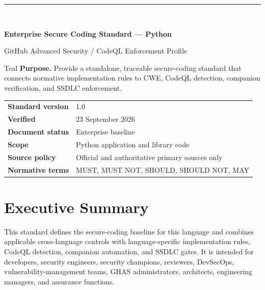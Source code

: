 \documentclass[10pt,letterpaper]{article}
\begin{document}
\fancyhead[L]{\textcolor{Muted}{Enterprise Secure Coding Standard --- Python}}
\fancyhead[R]{\textcolor{Muted}{v1.0 --- 23 September 2026}}
\hypersetup{pageanchor=false}
\begin{titlepage}
\thispagestyle{empty}
\vspace*{0.85in}
{\color{Teal}\rule{1.2in}{3pt}}\\[0.32in]
{\Huge\bfseries\color{Navy}Enterprise Secure Coding Standard --- Python\par}
\vspace{0.18in}
{\Large\color{Teal}GitHub Advanced Security / CodeQL Enforcement Profile\par}
\vspace{0.55in}
\begin{callout}{Teal}
\textbf{Purpose.} Provide a standalone, traceable secure-coding standard that connects normative implementation rules to CWE, CodeQL detection, companion verification, and SSDLC enforcement.
\end{callout}
\vfill
\begin{tabular}{@{}ll@{}}
\textbf{Standard version} & 1.0 \\
\textbf{Verified} & 23 September 2026 \\
\textbf{Document status} & Enterprise baseline \\
\textbf{Scope} & Python application and library code \\
\textbf{Source policy} & Official and authoritative primary sources only \\
\textbf{Normative terms} & MUST, MUST NOT, SHOULD, SHOULD NOT, MAY \\
\end{tabular}
\vspace{0.55in}
\end{titlepage}
\hypersetup{pageanchor=true}
\tableofcontents
\clearpage
{}

\section{Executive Summary}
This standard defines the secure-coding baseline for this language and combines applicable cross-language controls with language-specific implementation rules, CodeQL detection, companion automation, and SSDLC gates. It is intended for developers, security engineers, security champions, reviewers, DevSecOps, vulnerability-management teams, GHAS administrators, architects, engineering managers, and assurance functions.
\end{document}
